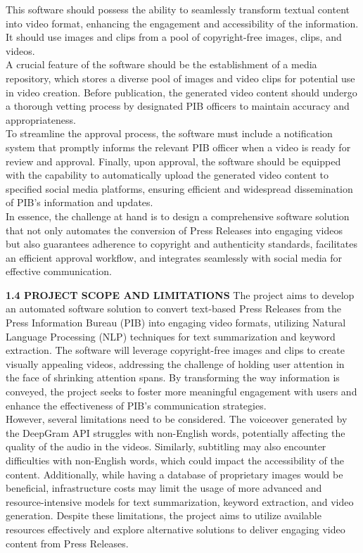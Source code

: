 \documentclass[12pt]{article}
\begin{document}
This software should possess the ability to seamlessly transform textual content into video format, enhancing the engagement and accessibility of the information. It should use images and clips from a pool of copyright-free images, clips, and videos.\\

A crucial feature of the software should be the establishment of a media repository, which stores a diverse pool of images and video clips for potential use in video creation. Before publication, the generated video content should undergo a thorough vetting process by designated PIB officers to maintain accuracy and appropriateness.
\\
To streamline the approval process, the software must include a notification system that promptly informs the relevant PIB officer when a video is ready for review and approval. Finally, upon approval, the software should be equipped with the capability to automatically upload the generated video content to specified social media platforms, ensuring efficient and widespread dissemination of PIB's information and updates.\\

In essence, the challenge at hand is to design a comprehensive software solution that not only automates the conversion of Press Releases into engaging videos but also guarantees adherence to copyright and authenticity standards, facilitates an efficient approval workflow, and integrates seamlessly with social media for effective communication.


\noindent  
\pagebreak


\noindent \fontsize{12}{12} \textbf{1.4 PROJECT SCOPE AND LIMITATIONS}
\justify
\hspace{5mm} The project aims to develop an automated software solution to convert text-based Press Releases from the Press Information Bureau (PIB) into engaging video formats, utilizing Natural Language Processing (NLP) techniques for text summarization and keyword extraction. The software will leverage copyright-free images and clips to create visually appealing videos, addressing the challenge of holding user attention in the face of shrinking attention spans. By transforming the way information is conveyed, the project seeks to foster more meaningful engagement with users and enhance the effectiveness of PIB's communication strategies.\\


However, several limitations need to be considered. The voiceover generated by the DeepGram API struggles with non-English words, potentially affecting the quality of the audio in the videos. Similarly, subtitling may also encounter difficulties with non-English words, which could impact the accessibility of the content. Additionally, while having a database of proprietary images would be beneficial, infrastructure costs may limit the usage of more advanced and resource-intensive models for text summarization, keyword extraction, and video generation. Despite these limitations, the project aims to utilize available resources effectively and explore alternative solutions to deliver engaging video content from Press Releases.\\
\end{document}
